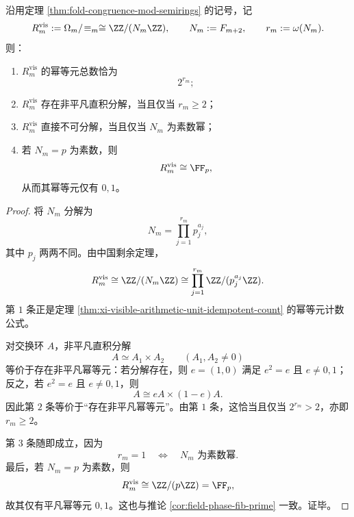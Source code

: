 \begin{theorem}\label{thm:xi-visible-arithmetic-omega-controlled-splitting}
沿用定理 \ref{thm:fold-congruence-mod-semirings} 的记号，记
\[
R_m^{\mathrm{vis}}
:=
\Omega_m/\!\equiv_m
\cong
\ZZ/(N_m\ZZ),
\qquad
N_m:=F_{m+2},
\qquad
r_m:=\omega(N_m).
\]
则：
\begin{enumerate}
  \item \(R_m^{\mathrm{vis}}\) 的幂等元总数恰为
  \[
  2^{r_m};
  \]
  \item \(R_m^{\mathrm{vis}}\) 存在非平凡直积分解，当且仅当 \(r_m\ge 2\)；
  \item \(R_m^{\mathrm{vis}}\) 直接不可分解，当且仅当 \(N_m\) 为素数幂；
  \item 若 \(N_m=p\) 为素数，则
  \[
  R_m^{\mathrm{vis}}\cong \FF_p,
  \]
  从而其幂等元仅有 \(0,1\)。
\end{enumerate}
\end{theorem}
\begin{proof}
将 \(N_m\) 分解为
\[
N_m=\prod_{j=1}^{r_m}p_j^{a_j},
\]
其中 \(p_j\) 两两不同。由中国剩余定理，
\[
R_m^{\mathrm{vis}}
\cong
\ZZ/(N_m\ZZ)
\cong
\prod_{j=1}^{r_m}\ZZ/(p_j^{a_j}\ZZ).
\]
第 \(1\) 条正是定理 \ref{thm:xi-visible-arithmetic-unit-idempotent-count} 的幂等元计数公式。

对交换环 \(A\)，非平凡直积分解
\[
A\simeq A_1\times A_2
\qquad
(A_1,A_2\neq 0)
\]
等价于存在非平凡幂等元：若分解存在，则 \(e=(1,0)\) 满足 \(e^2=e\) 且 \(e\neq 0,1\)；反之，若 \(e^2=e\) 且 \(e\neq 0,1\)，则
\[
A\cong eA\times (1-e)A.
\]
因此第 \(2\) 条等价于“存在非平凡幂等元”。由第 \(1\) 条，这恰当且仅当 \(2^{r_m}>2\)，亦即 \(r_m\ge 2\)。

第 \(3\) 条随即成立，因为
\[
r_m=1
\quad\Longleftrightarrow\quad
N_m \text{ 为素数幂}.
\]
最后，若 \(N_m=p\) 为素数，则
\[
R_m^{\mathrm{vis}}\cong \ZZ/(p\ZZ)=\FF_p,
\]
故其仅有平凡幂等元 \(0,1\)。这也与推论 \ref{cor:field-phase-fib-prime} 一致。证毕。
\end{proof}

